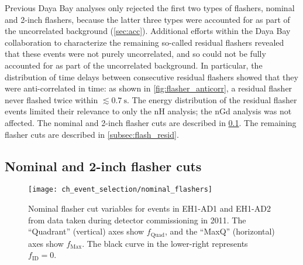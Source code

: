 Previous Daya Bay analyses only rejected the first two types of flashers,
nominal and 2-inch flashers,
because the latter three types were accounted for
as part of the uncorrelated background (\cref{sec:acc}).
Additional efforts within the Daya Bay collaboration
to characterize the remaining so-called residual flashers 
revealed that these events were not purely uncorrelated,
and so could not be fully accounted for as part of the uncorrelated background.
In particular, the distribution of time delays
between consecutive residual flashers
showed that they were anti-correlated in time:
as shown in \cref{fig:flasher_anticorr},
a residual flasher never flashed twice within $\lesssim \SI{0.7}{\s}$.
The energy distribution of the residual flasher events
limited their relevance to only the nH analysis; the nGd analysis was not affected.
The nominal and 2-inch flasher cuts are described in \cref{subsec:flash_nominal}.
The remaining flasher cuts are described in \cref{subsec:flash_resid}.

\subsection{Nominal and 2-inch flasher cuts}
\label{subsec:flash_nominal}

\begin{figure}
    \centering
    \texttt{[image: ch\_event\_selection/nominal\_flashers]}
    \caption[Nominal flasher cut variables]{
        Nominal flasher cut variables for events in EH1-AD1 and EH1-AD2
        from data taken during detector commissioning in 2011.
        The ``Quadrant'' (vertical) axes show $f_\text{Quad}$,
        and the ``MaxQ'' (horizontal) axes show $f_\text{Max}$.
        The black curve in the lower-right represents $f_\text{ID} = 0$.
    }
    \label{fig:flasher_nominal_cut}
\end{figure}

